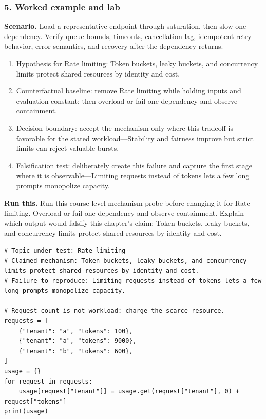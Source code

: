 \subsubsection*{5. Worked example and lab}
\textbf{Scenario.} Load a representative endpoint through saturation, then slow one dependency. Verify queue bounds, timeouts, cancellation lag, idempotent retry behavior, error semantics, and recovery after the dependency returns.
\begin{enumerate}
\item Hypothesis for Rate limiting: Token buckets, leaky buckets, and concurrency limits protect shared resources by identity and cost.
\item Counterfactual baseline: remove Rate limiting while holding inputs and evaluation constant; then overload or fail one dependency and observe containment.
\item Decision boundary: accept the mechanism only where this tradeoff is favorable for the stated workload—Stability and fairness improve but strict limits can reject valuable bursts.
\item Falsification test: deliberately create this failure and capture the first stage where it is observable—Limiting requests instead of tokens lets a few long prompts monopolize capacity.
\end{enumerate}
\textbf{Run this.} Run this course-level mechanism probe before changing it for Rate limiting. Overload or fail one dependency and observe containment. Explain which output would falsify this chapter's claim: Token buckets, leaky buckets, and concurrency limits protect shared resources by identity and cost.
\begin{Verbatim}[fontsize=\scriptsize]
# Topic under test: Rate limiting
# Claimed mechanism: Token buckets, leaky buckets, and concurrency limits protect shared resources by identity and cost.
# Failure to reproduce: Limiting requests instead of tokens lets a few long prompts monopolize capacity.

# Request count is not workload: charge the scarce resource.
requests = [
    {"tenant": "a", "tokens": 100},
    {"tenant": "a", "tokens": 9000},
    {"tenant": "b", "tokens": 600},
]
usage = {}
for request in requests:
    usage[request["tenant"]] = usage.get(request["tenant"], 0) + request["tokens"]
print(usage)
\end{Verbatim}
